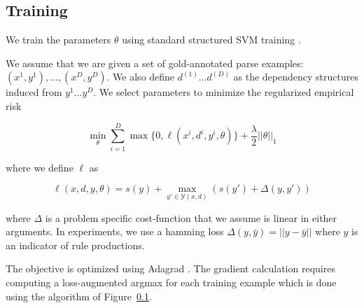 \documentclass[11pt,letterpaper]{article}
\DeclareMathOperator*{\argmin}{arg\,min}
\begin{document}
\subsection{Training}

We train the parameters $\theta$ using standard structured SVM training \cite{}.

We assume that we are given a set of gold-annotated parse examples: $( x^{1}, y^{1}), \ldots,  (x^{D}, y^{D})$. We also define $d^{(1)} \ldots d^{(D)}$ as the dependency structures induced from $y^{1} \ldots y^{D}$.
We select parameters to minimize the regularized empirical risk

\[ \min_{\theta} \sum_{i = 1}^D \max\{0,  \ell( x^{i}, d^{i} , y^{i}, \theta) \} + \frac{\lambda}{2} ||\theta||_1 \]

\noindent where we define $\ell$ as

\[\ell(x, d, y, \theta) = s(y) + \max_{y' \in \mathcal{Y}(x, d)}\left(s(y')  + \Delta(y, y') \right) \]


\noindent where $\Delta$ is a problem specific cost-function that we assume is linear in either arguments.
In experiments, we use a hamming loss  $\Delta(y, \bar{y}) = || y - \bar{y}||$ where $y$ is an indicator
of rule productions.

The objective is optimized using Adagrad \cite{}.  The gradient
calculation requires computing a loss-augmented argmax for each
training example which is done using the algorithm of Figure~\ref{}.






\end{document}
